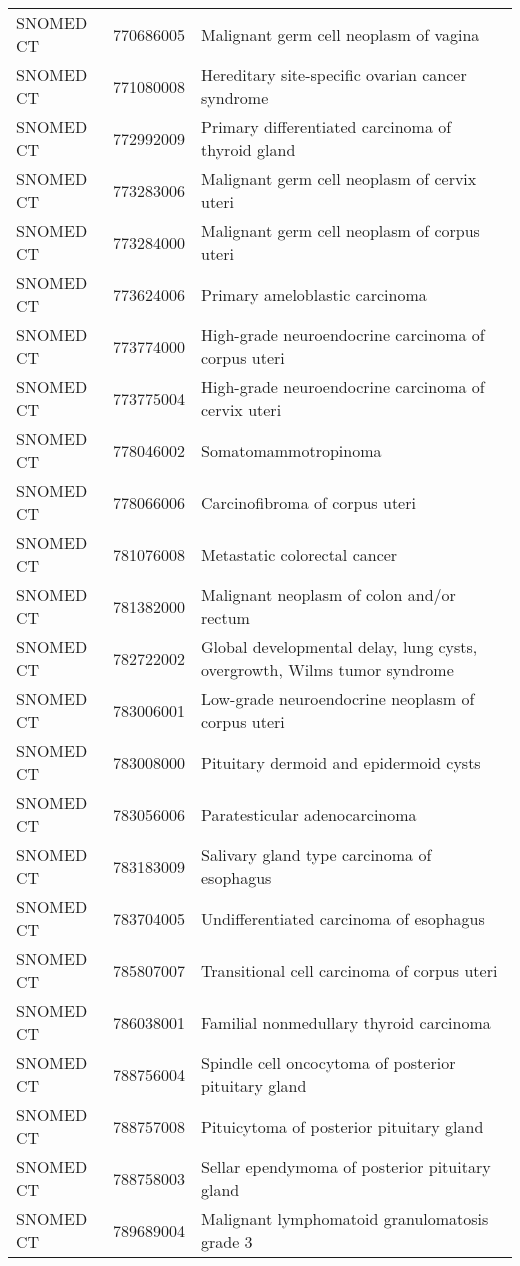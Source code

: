 \begin{longtable}{p{}p{}p{}}
  SNOMED CT & 770686005 & Malignant germ cell neoplasm of vagina \\ 
  SNOMED CT & 771080008 & Hereditary site-specific ovarian cancer syndrome \\ 
  SNOMED CT & 772992009 & Primary differentiated carcinoma of thyroid gland \\ 
  SNOMED CT & 773283006 & Malignant germ cell neoplasm of cervix uteri \\ 
  SNOMED CT & 773284000 & Malignant germ cell neoplasm of corpus uteri \\ 
  SNOMED CT & 773624006 & Primary ameloblastic carcinoma \\ 
  SNOMED CT & 773774000 & High-grade neuroendocrine carcinoma of corpus uteri \\ 
  SNOMED CT & 773775004 & High-grade neuroendocrine carcinoma of cervix uteri \\ 
  SNOMED CT & 778046002 & Somatomammotropinoma \\ 
  SNOMED CT & 778066006 & Carcinofibroma of corpus uteri \\ 
  SNOMED CT & 781076008 & Metastatic colorectal cancer \\ 
  SNOMED CT & 781382000 & Malignant neoplasm of colon and/or rectum \\ 
  SNOMED CT & 782722002 & Global developmental delay, lung cysts, overgrowth, Wilms tumor syndrome \\ 
  SNOMED CT & 783006001 & Low-grade neuroendocrine neoplasm of corpus uteri \\ 
  SNOMED CT & 783008000 & Pituitary dermoid and epidermoid cysts \\ 
  SNOMED CT & 783056006 & Paratesticular adenocarcinoma \\ 
  SNOMED CT & 783183009 & Salivary gland type carcinoma of esophagus \\ 
  SNOMED CT & 783704005 & Undifferentiated carcinoma of esophagus \\ 
  SNOMED CT & 785807007 & Transitional cell carcinoma of corpus uteri \\ 
  SNOMED CT & 786038001 & Familial nonmedullary thyroid carcinoma \\ 
  SNOMED CT & 788756004 & Spindle cell oncocytoma of posterior pituitary gland \\ 
  SNOMED CT & 788757008 & Pituicytoma of posterior pituitary gland \\ 
  SNOMED CT & 788758003 & Sellar ependymoma of posterior pituitary gland \\ 
  SNOMED CT & 789689004 & Malignant lymphomatoid granulomatosis grade 3 \\ 

\end{longtable}
